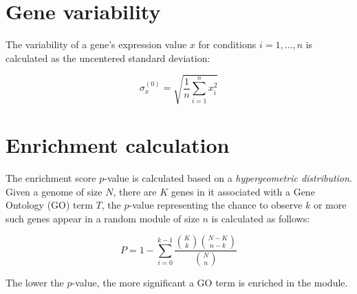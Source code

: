 \section{Gene variability}\label{apd:gene-sd}

The variability of a gene's expression value $x$ for conditions $i=1,…,n$ is 
calculated as the uncentered standard deviation: 

\begin{equation}
\sigma_x^{(0)}=\sqrt{\frac{1}{n}\sum\limits_{i=1}^{n}x_i^2}
\end{equation}


\section{Enrichment calculation}\label{apd:enrichment}

The enrichment score $p$-value is calculated based on a
\textit{hypergeometric distribution}.
%
Given a genome of size $N$, there are $K$ genes in it associated with
a Gene Ontology (GO) term $T$, the $p$-value representing the chance
to observe $k$ or more such genes appear in a random module of size
$n$ is calculated as follows:

\begin{equation}
P = 1-\sum\limits_{i=0}^{k-1}\frac{\binom{K}{k}\binom{N-K}{n-k}}{\binom{N}{n}}
\end{equation}

The lower the $p$-value, the more significant a GO term is enriched in
the module.
%






